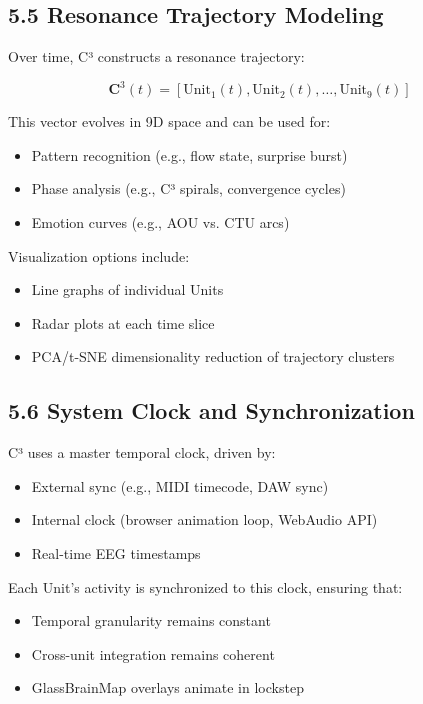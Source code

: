 \documentclass[10pt]{article}
\begin{document}
\subsection*{5.5 Resonance Trajectory Modeling}

Over time, C³ constructs a resonance trajectory:

\[
\mathbf{C}^3(t) = [\text{Unit}_1(t), \text{Unit}_2(t), \ldots, \text{Unit}_9(t)]
\]

This vector evolves in 9D space and can be used for:

\begin{itemize}
    \item Pattern recognition (e.g., flow state, surprise burst)
    \item Phase analysis (e.g., C³ spirals, convergence cycles)
    \item Emotion curves (e.g., AOU vs. CTU arcs)
\end{itemize}

Visualization options include:

\begin{itemize}
    \item Line graphs of individual Units
    \item Radar plots at each time slice
    \item PCA/t-SNE dimensionality reduction of trajectory clusters
\end{itemize}

\subsection*{5.6 System Clock and Synchronization}

C³ uses a master temporal clock, driven by:

\begin{itemize}
    \item External sync (e.g., MIDI timecode, DAW sync)
    \item Internal clock (browser animation loop, WebAudio API)
    \item Real-time EEG timestamps
\end{itemize}

Each Unit’s activity is synchronized to this clock, ensuring that:

\begin{itemize}
    \item Temporal granularity remains constant
    \item Cross-unit integration remains coherent
    \item GlassBrainMap overlays animate in lockstep
\end{itemize}
\end{document}
